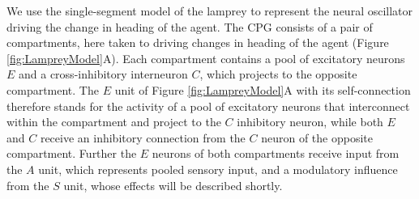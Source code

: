 \documentclass[11pt,a4paper]{article}
\begin{document}
 We use the single-segment model of the lamprey \citep{lansner1997realistic} to represent the neural oscillator driving the change in heading of the agent.
The CPG consists of a pair of compartments, here taken to driving changes in heading of the agent (Figure \ref{fig:LampreyModel}A). 
Each compartment contains a pool of excitatory neurons $E$ and a cross-inhibitory interneuron $C$, which projects to the opposite compartment.
 The $E$ unit of Figure \ref{fig:LampreyModel}A with its self-connection therefore stands for the activity of a pool of excitatory neurons that interconnect within the compartment and project to the $C$ inhibitory neuron, while both  $E$ and $C$ receive an inhibitory connection from the $C$ neuron of the opposite compartment.
  Further the $E$ neurons of both compartments receive input from the $A$ unit, which represents pooled sensory input, and a modulatory influence from the $S$ unit, whose effects will be described shortly.
\end{document}

